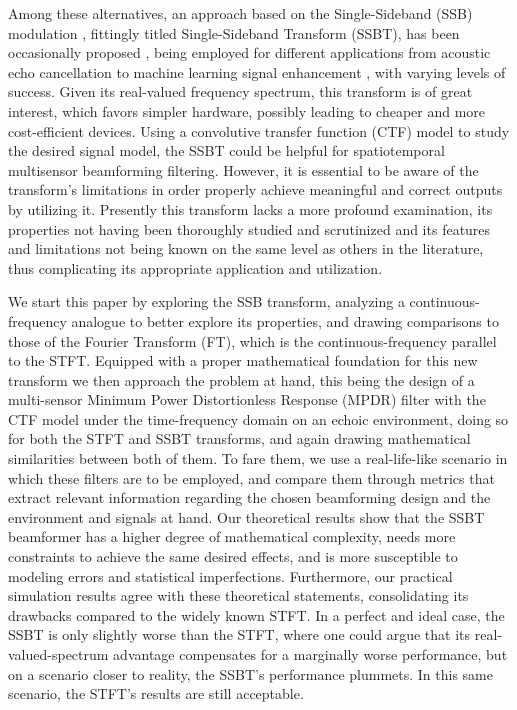 Among these alternatives, an approach based on the Single-Sideband (SSB) modulation \cite{chen_hybrid_2021,xing_single_2017}, fittingly titled Single-Sideband Transform (SSBT), has been occasionally proposed \cite{crochiere_multirate_1983,oyzerman_system_2012}, being employed for different applications from acoustic echo cancellation \cite{chin_subband_2001} to machine learning signal enhancement \cite{okamoto_subband_2017}, with varying levels of success. Given its real-valued frequency spectrum, this transform is of great interest, which favors simpler hardware, possibly leading to cheaper and more cost-efficient devices. Using a convolutive transfer function (CTF) model \cite{talmon_relative_2009} to study the desired signal model, the SSBT could be helpful for spatiotemporal multisensor beamforming filtering. However, it is essential to be aware of the transform's limitations in order properly achieve meaningful and correct outputs by utilizing it. Presently this transform lacks a more profound examination, its properties not having been thoroughly studied and scrutinized and its features and limitations not being known on the same level as others in the literature, thus complicating its appropriate application and utilization.

We start this paper by exploring the SSB transform, analyzing a continuous-frequency analogue to better explore its properties, and drawing comparisons to those of the Fourier Transform (FT), which is the continuous-frequency parallel to the STFT. Equipped with a proper mathematical foundation for this new transform we then approach the problem at hand, this being the design of a multi-sensor Minimum Power Distortionless Response (MPDR) filter with the CTF model under the time-frequency domain on an echoic environment, doing so for both the STFT and SSBT transforms, and again drawing mathematical similarities between both of them. To fare them, we use a real-life-like scenario in which these filters are to be employed, and compare them through metrics that extract relevant information regarding the chosen beamforming design and the environment and signals at hand. Our theoretical results show that the SSBT beamformer has a higher degree of mathematical complexity, needs more constraints to achieve the same desired effects, and is more susceptible to modeling errors and statistical imperfections. Furthermore, our practical simulation results agree with these theoretical statements, consolidating its drawbacks compared to the widely known STFT. In a perfect and ideal case, the SSBT is only slightly worse than the STFT, where one could argue that its real-valued-spectrum advantage compensates for a marginally worse performance, but on a scenario closer to reality, the SSBT's performance plummets. In this same scenario, the STFT's results are still acceptable.

